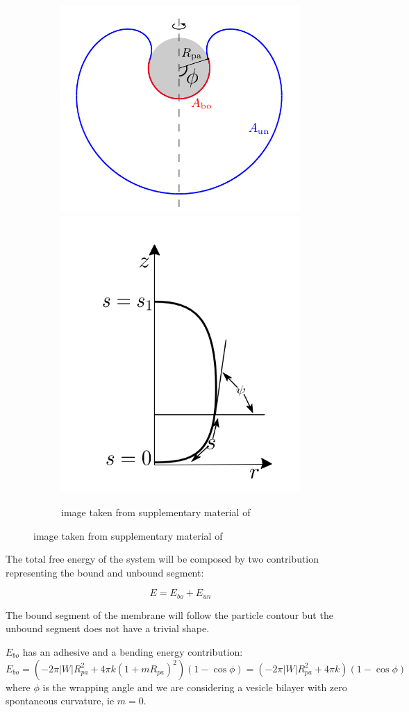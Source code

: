 \documentclass[12pt]{article}
\begin{document}
\begin{figure}[ht]
  \begin{center}
    \begin{subfigure}{0.9\textwidth}
      \includegraphics[width=0.45\linewidth]{img/system.png}
      \includegraphics[width=0.45\linewidth]{img/system2.png}
      \caption{image taken from supplementary material of \cite{agudo-canalejoCriticalParticleSizes2015}}
  \end{subfigure}
  \end{center}
  \label{fig:figure1}
\end{figure}

The total free energy of the system will be composed by two contribution representing the bound and unbound segment:

$$
E = E_{bo} + E_{un}
$$

The bound segment of the membrane will follow the particle contour but the unbound segment does not have a trivial shape.

$E_{bo}$ has an adhesive and a bending energy contribution: \cite{agudo-canalejoCriticalParticleSizes2015}
$$
E_{bo} = (-2 \pi |W| R_{pa}^2 + 4 \pi k(1+m R_{pa})^2)(1-\cos \phi) = (-2 \pi |W| R_{pa}^2 + 4 \pi k)(1-\cos \phi)
$$
where $\phi$ is the wrapping angle and we are considering a vesicle bilayer with zero spontaneous curvature, ie $m=0$.
\end{document}
